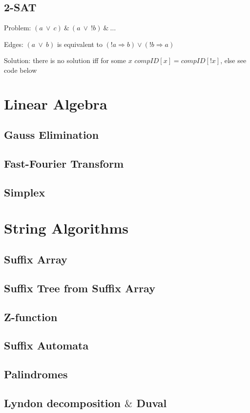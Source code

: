 \documentclass[10pt]{article}
\begin{document}
\subsection{2-SAT}
Problem: $(a ~ \vee ~ c) ~ \& ~ (a ~ \vee ~ !b) ~\& ~\ldots$

Edges: $(a ~ \vee ~ b)$ is equivalent to $(!a \Rightarrow b) \vee (!b \Rightarrow a)$

Solution: there is no solution iff for some $x$ $compID[x] = compID[!x]$, else see code below




\newpage
\section{Linear Algebra}
\subsection{Gauss Elimination}

\subsection{Fast-Fourier Transform}

\subsection{Simplex}




\newpage
\section{String Algorithms}
\subsection{Suffix Array}

\subsection{Suffix Tree from Suffix Array}

\subsection{Z-function}

\subsection{Suffix Automata}

\subsection{Palindromes}

\subsection{Lyndon decomposition $\&$ Duval}

\end{document}
